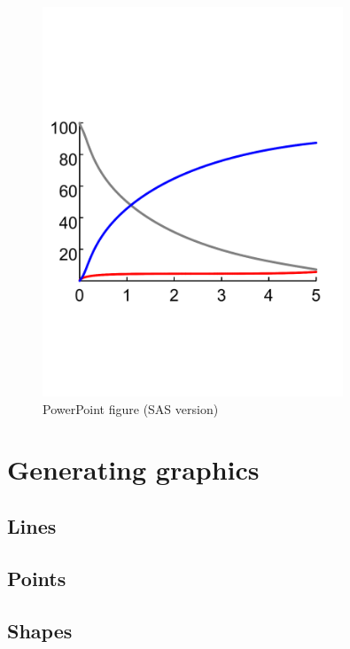 \documentclass[nojss]{jss}\usepackage[]{graphicx}\usepackage[]{color}
\begin{document}
\begin{figure}[!htpb]
    \centering
    \includegraphics[width=0.8\textwidth]{../inst/ceStatesST_ppt.pdf}
    \caption{PowerPoint figure (SAS version)}
    \label{F:sasPowerPoint}
\end{figure}

\section[Generating ggplot2 graphics]{Generating  graphics}\label{S:ggplot2tuple}

\subsection{Lines}\label{S:lines}

\subsection{Points}\label{S:points}
\subsection{Shapes}\label{S:shapes}
\end{document}
